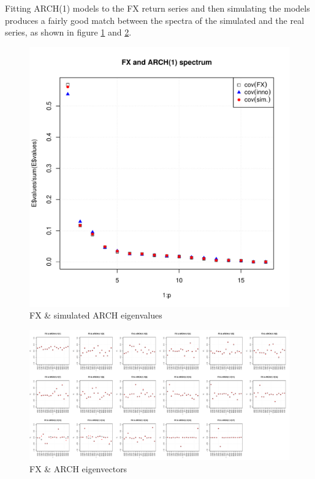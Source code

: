 \documentclass{article}
\begin{document}
Fitting ARCH(1) models to the FX return series and then simulating the
models produces a fairly good match between the spectra of the
simulated and the real series, as shown in figure
\ref{fig:FX_ARCH_eigenvalues} and \ref{fig:FX_ARCH_eigenvectors}.
\begin{figure}[htb!]
  \centering
  \includegraphics[scale=0.4]{FX_eigenvalues.pdf}  
  \caption{FX \& simulated ARCH eigenvalues}
  \label{fig:FX_ARCH_eigenvalues}
\end{figure}

\begin{figure}[htb!]
  \centering
  \includegraphics[scale=0.3]{FX_eigenvectors.pdf}  
  \caption{FX \& ARCH eigenvectors}
  \label{fig:FX_ARCH_eigenvectors}
\end{figure}
\end{document}
